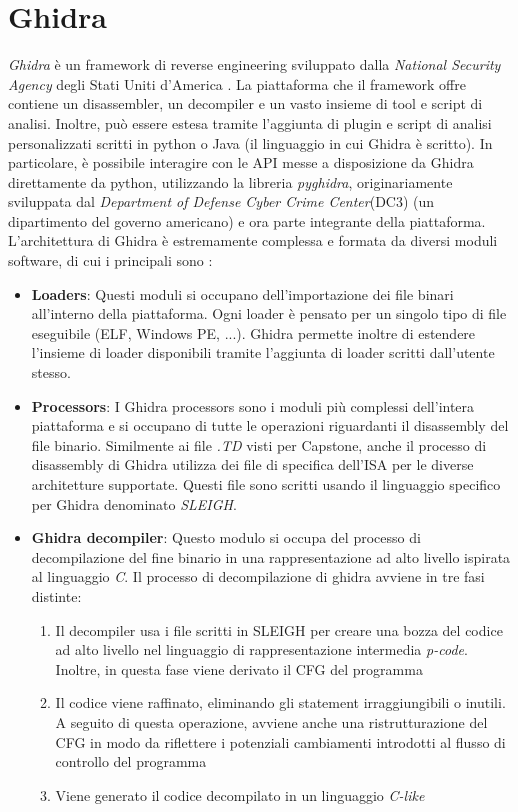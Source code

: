 \documentclass[../main.tex]{subfiles}
\begin{document}
\section{Ghidra}
\textit{Ghidra} è un framework di reverse engineering sviluppato dalla \textit{National Security Agency} degli Stati Uniti d'America \cite{eagle2020ghidra}.
La piattaforma che il framework offre contiene un disassembler, un decompiler e un vasto insieme di tool e script di analisi. Inoltre, può essere
estesa tramite l'aggiunta di plugin e script di analisi personalizzati scritti in python o Java (il linguaggio in cui Ghidra è scritto). In particolare, è possibile interagire con le API messe a disposizione da Ghidra
direttamente da python, utilizzando la libreria \textit{pyghidra}, originariamente sviluppata dal \textit{Department of Defense Cyber Crime Center}(DC3) (un dipartimento del governo americano) e ora parte integrante della piattaforma.
L'architettura di Ghidra è estremamente complessa e formata da diversi moduli software, di cui i principali sono \cite{eagle2020ghidra}:
\begin{itemize}
    \item \textbf{Loaders}: Questi moduli si occupano dell'importazione dei file binari all'interno della piattaforma. Ogni loader è pensato per un singolo tipo di file eseguibile (ELF, Windows PE, ...). Ghidra permette inoltre di estendere
    l'insieme di loader disponibili tramite l'aggiunta di loader scritti dall'utente stesso.
    \item \textbf{Processors}: I Ghidra processors sono i moduli più complessi dell'intera piattaforma e si occupano di tutte le operazioni riguardanti il disassembly del file binario. Similmente ai file \textit{.TD} visti per Capstone, anche il processo di disassembly di Ghidra utilizza
    dei file di specifica dell'ISA per le diverse architetture supportate. Questi file sono scritti usando il linguaggio specifico per Ghidra denominato \textit{SLEIGH}.
    \item \textbf{Ghidra decompiler}: Questo modulo si occupa del processo di decompilazione del fine binario in una rappresentazione ad alto livello ispirata al linguaggio \textit{C}. Il processo di decompilazione di ghidra avviene in tre fasi distinte:
    \begin{enumerate}
        \item Il decompiler usa i file scritti in SLEIGH per creare una bozza del codice ad alto livello nel linguaggio di rappresentazione intermedia \textit{p-code}. Inoltre, in questa fase viene derivato il CFG del programma
        \item Il codice viene raffinato, eliminando gli statement irraggiungibili o inutili. A seguito di questa operazione, avviene anche una ristrutturazione del CFG in modo da riflettere i potenziali cambiamenti introdotti al flusso di controllo del programma
        \item Viene generato il codice decompilato in un linguaggio \textit{C-like}
    \end{enumerate}
\end{itemize}
\end{document}

